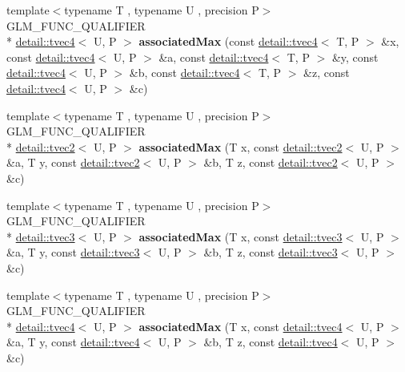 \begin{DoxyCompactItemize}
\item 
\hypertarget{namespaceglm_afdf990bf8674c1e728c5664e22a52408}{{\footnotesize template$<$typename T , typename U , precision P$>$ }\\G\-L\-M\-\_\-\-F\-U\-N\-C\-\_\-\-Q\-U\-A\-L\-I\-F\-I\-E\-R \\*
\hyperlink{structglm_1_1detail_1_1tvec4}{detail\-::tvec4}$<$ U, P $>$ {\bfseries associated\-Max} (const \hyperlink{structglm_1_1detail_1_1tvec4}{detail\-::tvec4}$<$ T, P $>$ \&x, const \hyperlink{structglm_1_1detail_1_1tvec4}{detail\-::tvec4}$<$ U, P $>$ \&a, const \hyperlink{structglm_1_1detail_1_1tvec4}{detail\-::tvec4}$<$ T, P $>$ \&y, const \hyperlink{structglm_1_1detail_1_1tvec4}{detail\-::tvec4}$<$ U, P $>$ \&b, const \hyperlink{structglm_1_1detail_1_1tvec4}{detail\-::tvec4}$<$ T, P $>$ \&z, const \hyperlink{structglm_1_1detail_1_1tvec4}{detail\-::tvec4}$<$ U, P $>$ \&c)}\label{namespaceglm_afdf990bf8674c1e728c5664e22a52408}

\item 
\hypertarget{namespaceglm_a466c6dd94844a19306e9ee8a2f9eee2f}{{\footnotesize template$<$typename T , typename U , precision P$>$ }\\G\-L\-M\-\_\-\-F\-U\-N\-C\-\_\-\-Q\-U\-A\-L\-I\-F\-I\-E\-R \\*
\hyperlink{structglm_1_1detail_1_1tvec2}{detail\-::tvec2}$<$ U, P $>$ {\bfseries associated\-Max} (T x, const \hyperlink{structglm_1_1detail_1_1tvec2}{detail\-::tvec2}$<$ U, P $>$ \&a, T y, const \hyperlink{structglm_1_1detail_1_1tvec2}{detail\-::tvec2}$<$ U, P $>$ \&b, T z, const \hyperlink{structglm_1_1detail_1_1tvec2}{detail\-::tvec2}$<$ U, P $>$ \&c)}\label{namespaceglm_a466c6dd94844a19306e9ee8a2f9eee2f}

\item 
\hypertarget{namespaceglm_a3921c9a8740abd10014acacb21d1822b}{{\footnotesize template$<$typename T , typename U , precision P$>$ }\\G\-L\-M\-\_\-\-F\-U\-N\-C\-\_\-\-Q\-U\-A\-L\-I\-F\-I\-E\-R \\*
\hyperlink{structglm_1_1detail_1_1tvec3}{detail\-::tvec3}$<$ U, P $>$ {\bfseries associated\-Max} (T x, const \hyperlink{structglm_1_1detail_1_1tvec3}{detail\-::tvec3}$<$ U, P $>$ \&a, T y, const \hyperlink{structglm_1_1detail_1_1tvec3}{detail\-::tvec3}$<$ U, P $>$ \&b, T z, const \hyperlink{structglm_1_1detail_1_1tvec3}{detail\-::tvec3}$<$ U, P $>$ \&c)}\label{namespaceglm_a3921c9a8740abd10014acacb21d1822b}

\item 
\hypertarget{namespaceglm_a3c336bee3c720fd04904466779376d20}{{\footnotesize template$<$typename T , typename U , precision P$>$ }\\G\-L\-M\-\_\-\-F\-U\-N\-C\-\_\-\-Q\-U\-A\-L\-I\-F\-I\-E\-R \\*
\hyperlink{structglm_1_1detail_1_1tvec4}{detail\-::tvec4}$<$ U, P $>$ {\bfseries associated\-Max} (T x, const \hyperlink{structglm_1_1detail_1_1tvec4}{detail\-::tvec4}$<$ U, P $>$ \&a, T y, const \hyperlink{structglm_1_1detail_1_1tvec4}{detail\-::tvec4}$<$ U, P $>$ \&b, T z, const \hyperlink{structglm_1_1detail_1_1tvec4}{detail\-::tvec4}$<$ U, P $>$ \&c)}\label{namespaceglm_a3c336bee3c720fd04904466779376d20}


\end{DoxyCompactItemize}
